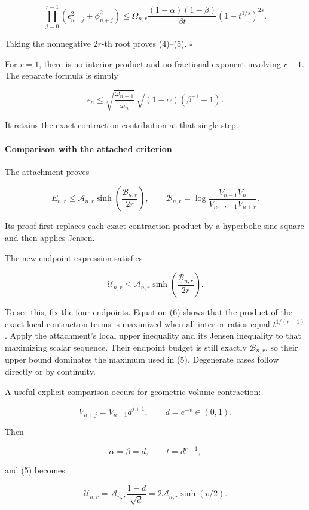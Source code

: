 \[
\prod_{j=0}^{r-1}
(\epsilon_{n+j}^2+\phi_{n+j}^2)
\le
\Omega_{n,r}
\frac{(1-\alpha)(1-\beta)}{\beta t}
(1-t^{1/s})^{2s}.
\]

Taking the nonnegative \(2r\)-th root proves (4)--(5). \(\square\)

For \(r=1\), there is no interior product and no fractional exponent involving \(r-1\). The separate formula is simply

\[
\boxed{
\epsilon_n
\le
\sqrt{\frac{\omega_{n+1}}{\omega_n}}\,
\sqrt{(1-\alpha)(\beta^{-1}-1)}.
}
\tag{7}
\]

It retains the exact contraction contribution at that single step.

\paragraph{Comparison with the attached criterion}\label{endpoint-user_product_original--comparison-with-the-attached-criterion}

The attachment proves

\[
E_{n,r}\le
\mathcal A_{n,r}
\sinh\!\left(\frac{\mathcal B_{n,r}}{2r}\right),
\qquad
\mathcal B_{n,r}
=
\log\frac{V_{n-1}V_n}{V_{n+r-1}V_{n+r}}.
\]

Its proof first replaces each exact contraction product by a hyperbolic-sine square and then applies Jensen.

The new endpoint expression satisfies

\[
\boxed{
\mathcal U_{n,r}
\le
\mathcal A_{n,r}
\sinh\!\left(\frac{\mathcal B_{n,r}}{2r}\right).
}
\tag{8}
\]

To see this, fix the four endpoints. Equation (6) shows that the product of the exact local contraction terms is maximized when all interior ratios equal \(t^{1/(r-1)}\). Apply the attachment's local upper inequality and its Jensen inequality to that maximizing scalar sequence. Their endpoint budget is still exactly \(\mathcal B_{n,r}\), so their upper bound dominates the maximum used in (5). Degenerate cases follow directly or by continuity.

A useful explicit comparison occurs for geometric volume contraction:

\[
V_{n+j}=V_{n-1}d^{j+1},\qquad d=e^{-v}\in(0,1).
\]

Then

\[
\alpha=\beta=d,\qquad t=d^{r-1},
\]

and (5) becomes

\[
\boxed{
\mathcal U_{n,r}
=
\mathcal A_{n,r}\frac{1-d}{\sqrt d}
=
2\mathcal A_{n,r}\sinh(v/2).
}
\tag{9}
\]

